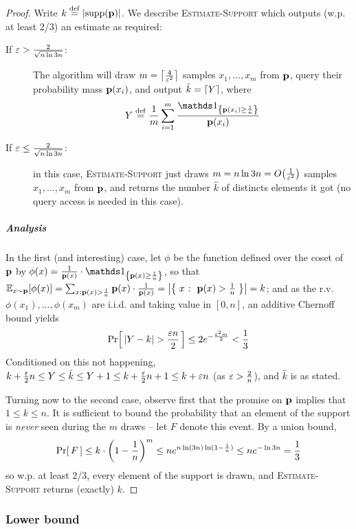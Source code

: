 \begin{proof}
  Write $k\stackrel{\rm def}{=} \left\lvert \operatorname{supp}\!\left(\mathbf{p}\right) \right\rvert$. We describe \textsc{Estimate-Support} which outputs (w.p. at least 2/3) an estimate as required:
  \begin{description}
    \item[If $\varepsilon > \frac{2}{\sqrt{n\ln 3n}}$:]
The algorithm will draw $m=\left\lceil \frac{4}{\varepsilon^2} \right\rceil$ samples $x_1,\dots, x_m$ from $\mathbf{p}$, query their probability mass $\mathbf{p}(x_i)$, and output $\hat{k}=\left\lceil Y \right\rceil$, where
  \[
    Y \eqdef \frac{1}{m}\sum_{i=1}^m \frac{\indic{\D(x_i) \geq \frac{1}{n} }}{\D(x_i)}
  \]
    \item[If $\varepsilon \leq \frac{2}{\sqrt{n\ln 3n}}$:] in this case, \textsc{Estimate-Support} just draws $m=n\ln 3n=\bigO{\frac{1}{\eps^2}}$ samples $x_1,\dots, x_m$ from $\mathbf{p}$, and returns the number $\hat{k}$ of distincts elements it got (no query access is needed in this case).
  \end{description}

\subparagraph{Analysis} In the first (and interesting) case, let $\phi$ be the function defined over the coset of $\mathbf{p}$ by $\phi(x)=\frac{1}{\D(x)}\cdot\indic{\D(x) \geq \frac{1}{n} }$, so that $\mathbb{E}_{x\sim\mathbf{p}}[ \phi(x) ] = \sum_{x: \mathbf{p}(x) > \frac{1}{n}} \mathbf{p}(x)\cdot\frac{1}{\mathbf{p}(x)} = \left\lvert \left\{\; x \;\colon\; \mathbf{p}(x) > \frac{1}{n}\; \right\} \right\rvert=k$; and as the r.v. $\phi(x_1),\dots, \phi(x_m)$ are i.i.d. and taking value in $[0,n]$, an additive Chernoff bound yields
\[
  \Pr\!\left[\,  \left\lvert Y - k  \right\rvert  > \frac{\varepsilon n}{2} \, \right] \leq 2e^{-\frac{\varepsilon^2 m}{2}} < \frac{1}{3}
\]
Conditioned on this not happening, $k + \frac{\varepsilon}{2}n \leq Y \leq \hat{k}\leq Y + 1 \leq k + \frac{\varepsilon}{2}n + 1 \leq k + \varepsilon n$ (as $\varepsilon > \frac{2}{n}$), and $\hat{k}$ is as stated.

Turning now to the second case, observe first that the promise on $\mathbf{p}$ implies that $1 \leq k \leq n$. It is sufficient to bound the probability that an element of the support is \emph{never} seen during the $m$ draws -- let $F$ denote this event. By a union bound,
\[
  \Pr\!\left[\,  F \, \right] \leq k\cdot\left(1-\frac{1}{n}\right)^m \leq n e^{n\ln (3n)\ln(1-\frac{1}{n})} \leq n e^{-\ln 3n} = \frac{1}{3} 
\]
so w.p. at least $2/3$, every element of the support is drawn, and \textsc{Estimate-Support} returns (exactly) $k$.
\end{proof}


\subsubsection{Lower bound}

